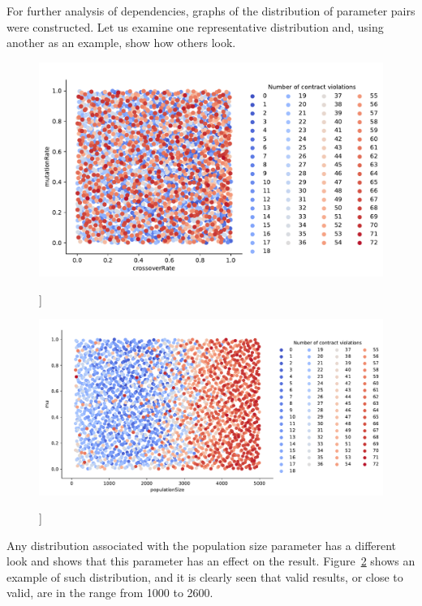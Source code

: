 For further analysis of dependencies, graphs of the distribution of parameter pairs were constructed. Let us examine one representative distribution and, using another as an example, show how others look.

\begin{figure}
	\centering
	\includegraphics[width=\textwidth]{images/CrossoverRateVsutationRate.pdf}
	\caption[]]{}
	\label{fig:CrossoverRateVmutationRate}
\end{figure}

\begin{figure}
	\centering
	\includegraphics[width=\textwidth]{images/populatioSizeVsMu.pdf}
	\caption[]]{}
	\label{fig:populatioSizeVsMu}
\end{figure}

Any distribution associated with the population size parameter has a different look and shows that this parameter has an effect on the result.
Figure~\ref{fig:populatioSizeVsMu} shows an example of such distribution, and it is clearly seen that valid results, or close to valid, are in the range from 1000 to 2600.

